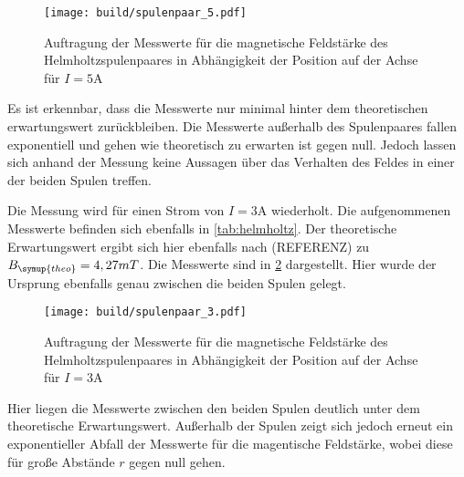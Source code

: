 \begin{figure}
  \centering
  \texttt{[image: build/spulenpaar\_5.pdf]}
  \caption{Auftragung der Messwerte für die magnetische Feldstärke des Helmholtzspulenpaares
  in Abhängigkeit der Position auf der Achse für $I=5$A}
  \label{fig:spulenpaar_5}
\end{figure}

Es ist erkennbar, dass die Messwerte nur minimal hinter dem theoretischen erwartungswert
zurückbleiben. Die Messwerte außerhalb des Spulenpaares fallen exponentiell und gehen
wie theoretisch zu erwarten ist gegen null. Jedoch lassen sich anhand der Messung keine
Aussagen über das Verhalten des Feldes in einer der beiden Spulen treffen.


Die Messung wird für einen Strom von $I=3$A wiederholt. Die aufgenommenen Messwerte
befinden sich ebenfalls in \ref{tab:helmholtz}. Der theoretische Erwartungswert
ergibt sich hier ebenfalls nach (REFERENZ) zu $B_{\symup{theo}}=4,27mT$. Die Messwerte
sind in \ref{fig:spulenpaar_3} dargestellt. Hier wurde der Ursprung ebenfalls genau
zwischen die beiden Spulen gelegt.

\begin{figure}
  \centering
  \texttt{[image: build/spulenpaar\_3.pdf]}
  \caption{Auftragung der Messwerte für die magnetische Feldstärke des Helmholtzspulenpaares
  in Abhängigkeit der Position auf der Achse für $I=3$A}
  \label{fig:spulenpaar_3}
\end{figure}

Hier liegen die Messwerte zwischen den beiden Spulen deutlich unter dem
theoretische Erwartungswert. Außerhalb der Spulen zeigt sich jedoch erneut ein
exponentieller Abfall der Messwerte für die magentische Feldstärke, wobei diese für
große Abstände $r$ gegen null gehen.


